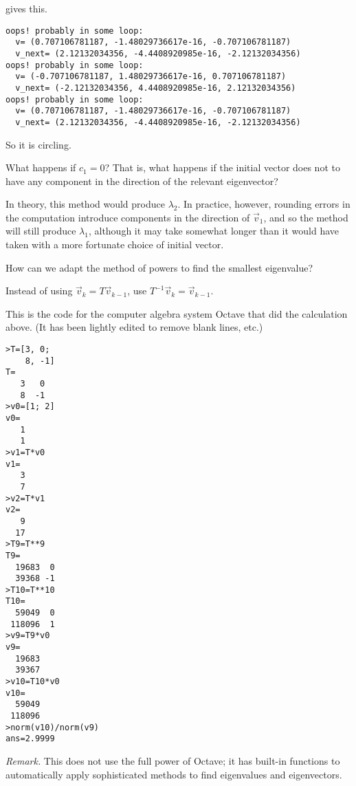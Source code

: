 \begin{exercises}
\begin{answer}
\begin{exparts}
\begin{lstlisting}
\end{lstlisting}
           gives this.
\begin{lstlisting}
oops! probably in some loop: 
  v= (0.707106781187, -1.48029736617e-16, -0.707106781187) 
  v_next= (2.12132034356, -4.4408920985e-16, -2.12132034356) 
oops! probably in some loop: 
  v= (-0.707106781187, 1.48029736617e-16, 0.707106781187) 
  v_next= (-2.12132034356, 4.4408920985e-16, 2.12132034356)
oops! probably in some loop: 
  v= (0.707106781187, -1.48029736617e-16, -0.707106781187) 
  v_next= (2.12132034356, -4.4408920985e-16, -2.12132034356)           
\end{lstlisting}
          So it is circling.
       \end{exparts}
     \end{answer}
  \item 
      What happens if $c_1=0$?
      That is, what happens if the initial vector does not to have any 
      component in the direction of the relevant eigenvector?
     \begin{answer}
       In theory, this method would produce $\lambda_2$.
       In practice, however, rounding errors in the computation introduce
       components in the direction of $\vec{v}_1$, and so the method will
       still produce $\lambda_1$, although it may take somewhat longer than
       it would have taken with a more fortunate choice of initial vector. 
     \end{answer}
  \item 
    How can we adapt the method of powers
    to find the smallest eigenvalue?
    \begin{answer}
      Instead of using $\vec{v}_k=T\vec{v}_{k-1}$, 
      use $T^{-1}\vec{v}_k=\vec{v}_{k-1}$.
    \end{answer}
\end{exercises}

\announcecomputercode
This is the code for the computer algebra system Octave that did
the calculation above.
(It has been lightly edited to remove blank lines, etc.)
\begin{lstlisting}
>T=[3, 0;
    8, -1]
T=
   3   0
   8  -1
>v0=[1; 2]
v0=
   1
   1
>v1=T*v0
v1=
   3
   7
>v2=T*v1
v2=
   9
  17
>T9=T**9
T9=
  19683  0
  39368 -1
>T10=T**10
T10=
  59049  0
 118096  1
>v9=T9*v0
v9=
  19683
  39367
>v10=T10*v0
v10=
  59049
 118096
>norm(v10)/norm(v9)
ans=2.9999
\end{lstlisting}
\textit{Remark.}
This does not use the full power of Octave;
it has built-in functions to automatically
apply sophisticated methods to find eigenvalues and eigenvectors.

\endinput





